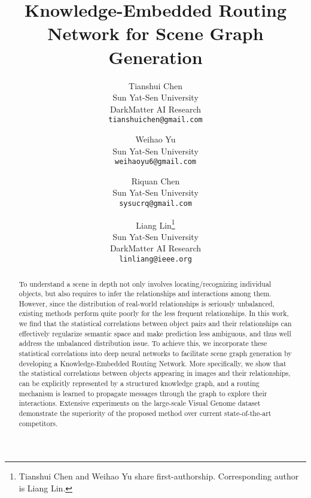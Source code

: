 \documentclass[10pt,twocolumn,letterpaper]{article}
\begin{document}
\title{Knowledge-Embedded Routing Network for Scene Graph Generation}

\author{Tianshui Chen\\
Sun Yat-Sen University\\
DarkMatter AI Research\\
{\tt\small tianshuichen@gmail.com}
\and
Weihao Yu\\
Sun Yat-Sen University\\
{\tt\small weihaoyu6@gmail.com}\\
\and
Riquan Chen\\
Sun Yat-Sen University\\
{\tt\small sysucrq@gmail.com}
\and
Liang Lin\thanks{Tianshui Chen and Weihao Yu share first-authorship. Corresponding author is Liang Lin.}\\
Sun Yat-Sen University\\
DarkMatter AI Research\\
{\tt\small linliang@ieee.org}
}

\maketitle


\begin{abstract}
To understand a scene in depth not only involves locating/recognizing individual objects, but also requires to infer the relationships and interactions among them. However, since the distribution of real-world relationships is seriously unbalanced, existing methods perform quite poorly for the less frequent relationships. In this work, we find that the statistical correlations between object pairs and their relationships can effectively regularize semantic space and make prediction less ambiguous, and thus well address the unbalanced distribution issue. To achieve this, we incorporate these statistical correlations into deep neural networks to facilitate scene graph generation by developing a Knowledge-Embedded Routing Network. More specifically, we show that the statistical correlations between objects appearing in images and their relationships, can be explicitly represented by a structured knowledge graph, and a routing mechanism is learned to propagate messages through the graph to explore their interactions. Extensive experiments on the large-scale Visual Genome dataset demonstrate the superiority of the proposed method over current state-of-the-art competitors.
\end{abstract}
\end{document}
